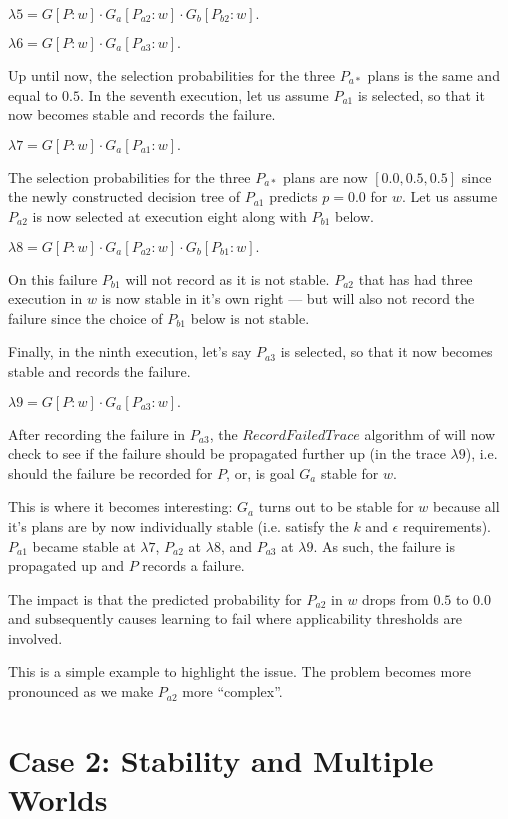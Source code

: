\documentclass[a4paper]{article}
\begin{document}
$\lambda5 = G[P:w] \cdot G_a[P_{a2}:w] \cdot G_b[P_{b2}:w].$

$\lambda6 = G[P:w] \cdot G_a[P_{a3}:w].$

Up until now, the selection probabilities for the three $P_{a*}$ plans is the same and equal to $0.5$. In the seventh execution, let us assume $P_{a1}$ is selected, so that it now becomes stable and records the failure.

$\lambda7 = G[P:w] \cdot G_a[P_{a1}:w].$

The selection probabilities for the three $P_{a*}$ plans are now $[0.0,0.5,0.5]$ since the newly constructed decision tree of $P_{a1}$ predicts $p=0.0$ for $w$. Let us assume $P_{a2}$ is now selected at execution eight along with $P_{b1}$ below. 

$\lambda8 = G[P:w] \cdot G_a[P_{a2}:w] \cdot G_b[P_{b1}:w].$

On this failure $P_{b1}$ will not record as it is not stable. $P_{a2}$ that has had three execution in $w$ is now stable in it's own right --- but will also not record the failure since the choice of $P_{b1}$ below is not stable.


Finally, in the ninth execution, let's say $P_{a3}$ is selected, so that it now becomes stable and records the failure.

$\lambda9 = G[P:w] \cdot G_a[P_{a3}:w].$

After recording the failure in $P_{a3}$, the $RecordFailedTrace$ algorithm of \cite{Singh:AAMAS10} will now check to see if the failure should be propagated further up (in the trace $\lambda9$), i.e. should the failure be recorded for $P$, or, is goal $G_a$ stable for $w$. 

This is where it becomes interesting: $G_a$ turns out to be stable for $w$ because all it's plans are by now individually stable (i.e. satisfy the $k$ and $\epsilon$ requirements). $P_{a1}$ became stable at $\lambda7$, $P_{a2}$ at $\lambda8$, and $P_{a3}$ at $\lambda9$. As such, the failure is propagated up and $P$ records a failure.

The impact is that the predicted probability for $P_{a2}$ in $w$ drops from $0.5$ to $0.0$ and subsequently causes learning to fail where applicability thresholds are involved. 

This is a simple example to highlight the issue. The problem becomes more pronounced as we make $P_{a2}$ more ``complex''.



\section{Case 2: Stability and Multiple Worlds}
\end{document}
